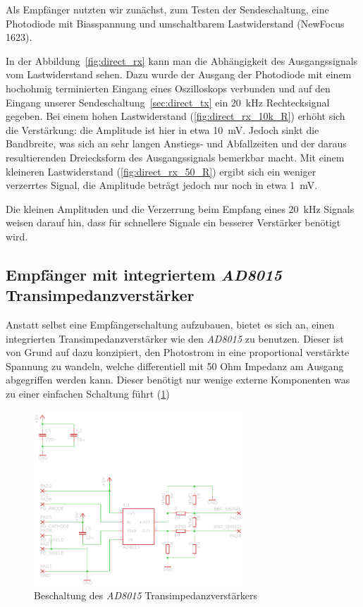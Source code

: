 \documentclass[12pt,a4paper]{article}
\begin{document}
Als Empfänger nutzten wir zunächst, zum Testen der Sendeschaltung, eine Photodiode mit Biasspannung und umschaltbarem Lastwiderstand (NewFocus 1623).

In der Abbildung~\ref{fig:direct_rx} kann man die Abhängigkeit des Ausgangssignals vom Lastwiderstand sehen. Dazu wurde der Ausgang der Photodiode mit einem hochohmig terminierten Eingang eines Oszilloskops verbunden und auf den Eingang unserer Sendeschaltung~\ref{sec:direct_tx} ein \SI{20}{\kilo\hertz} Rechtecksignal gegeben. Bei einem hohen Lastwiderstand (\ref{fig:direct_rx_10k_R}) erhöht sich die Verstärkung: die Amplitude ist hier in etwa \SI{10}{\milli\volt}. Jedoch sinkt die Bandbreite, was sich an sehr langen Anstiegs- und Abfallzeiten und der daraus resultierenden Dreiecksform des Ausgangssignals bemerkbar macht. Mit einem kleineren Lastwiderstand (\ref{fig:direct_rx_50_R}) ergibt sich ein weniger verzerrtes Signal, die Amplitude beträgt jedoch nur noch in etwa \SI{1}{\milli\volt}.

Die kleinen Amplituden und die Verzerrung beim Empfang eines \SI{20}{\kilo\hertz} Signals weisen darauf hin, dass für schnellere Signale ein besserer Verstärker benötigt wird.

\subsection{Empfänger mit integriertem \textit{AD8015} Transimpedanzverstärker}
Anstatt selbst eine Empfängerschaltung aufzubauen, bietet es sich an, einen integrierten Transimpedanzverstärker wie den \textit{AD8015} zu benutzen. Dieser ist von Grund auf dazu konzipiert, den Photostrom in eine proportional verstärkte Spannung zu wandeln, welche differentiell mit 50 Ohm Impedanz am Ausgang abgegriffen werden kann. Dieser benötigt nur wenige externe Komponenten was zu einer einfachen Schaltung führt (\ref{fig:receiver_sch})


\begin{figure}[H]
  \centering
    \includegraphics[width=0.7\textwidth]{img/receiver.pdf}
  \caption{Beschaltung des \textit{AD8015} Transimpedanzverstärkers}
  \label{fig:receiver_sch}
\end{figure}
\end{document}
